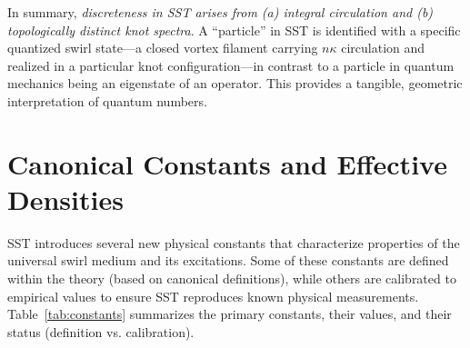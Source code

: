 \documentclass[10pt,reprint,aps,onecolumn,nofootinbib]{revtex4-2}
\begin{document}
	In summary, \emph{discreteness in SST arises from (a) integral circulation and (b) topologically distinct knot spectra}. A “particle” in SST is identified with a specific quantized swirl state—a closed vortex filament carrying $n\kappa$ circulation and realized in a particular knot configuration—in contrast to a particle in quantum mechanics being an eigenstate of an operator. This provides a tangible, geometric interpretation of quantum numbers.



	\section{Canonical Constants and Effective Densities}
	SST introduces several new physical constants that characterize properties of the universal swirl medium and its excitations. Some of these constants are defined within the theory (based on canonical definitions), while others are calibrated to empirical values to ensure SST reproduces known physical measurements. Table~\ref{tab:constants} summarizes the primary constants, their values, and their status (definition vs. calibration).
\end{document}
